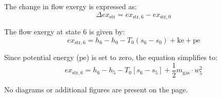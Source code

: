 The change in flow exergy is expressed as:  
\[
\Delta ex_{\text{str}} = ex_{\text{str},6} - ex_{\text{str},0}
\]

The flow exergy at state 6 is given by:  
\[
ex_{\text{str},6} = h_6 - h_0 - T_0(s_6 - s_0) + \text{ke} + \text{pe}
\]

Since potential energy (\( \text{pe} \)) is set to zero, the equation simplifies to:  
\[
ex_{\text{str},6} = h_6 - h_5 - T_0[s_6 - s_5] + \frac{1}{2} m_{\text{gas}} \cdot w_5^2
\]  

No diagrams or additional figures are present on the page.